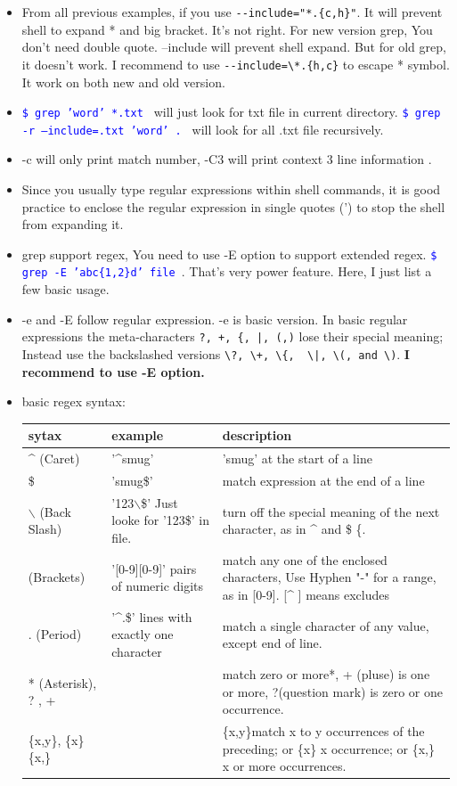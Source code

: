 \documentclass[a4paper,12pt,twoside]{book}
\newcommand{\linuxcommand}[1]{\texttt{\textcolor{blue}{\$ #1 \Pisymbol{psy}{191}}}}
\begin{document}
\begin{itemize}
		\item From all previous examples, if you use \verb!--include="*.{c,h}"!. It will prevent shell to expand * and big bracket. It's not right. For new version grep, You don't need double quote. --include will prevent shell expand. But for old grep, it doesn't work. I recommend to use \verb!--include=\*.{h,c}! to escape * symbol. It work on both new and old version.  

		\item \linuxcommand{grep 'word' *.txt} will just look for txt file in current directory. \linuxcommand{grep -r --include=\*.txt 'word' .} will look for all .txt file recursively.  

		\item -c will only print  match number, -C3 will print context 3 line information .  

		\item Since you usually type regular expressions within shell commands, it is good practice to enclose the regular expression in single quotes (') to stop the shell from expanding it. 

		\item grep support regex, You need to use -E option to support extended regex. \linuxcommand{grep -E 'abc\{1,2\}d' file}.  That's very power feature. Here, I just list a few basic usage. 

		\item -e and -E follow regular expression. -e is basic version. In basic regular expressions the meta-characters \verb=?, +, {, |, (,)= lose their special meaning; Instead use the backslashed versions \verb=\?, \+, \{,  \|, \(, and \)=. \textbf{I recommend to use -E option.}

		\item basic regex syntax:

 \begin{tabular}{p{}|p{}|p{}}
\hline 
sytax 	& example & 	description \\

\hline 
\^{} (Caret)	& '\^{}smug'  & 	'smug' at the start of a line \\
\hline 
\$ &  'smug\$' & 	match expression at the end of a line\\
\hline 
$\backslash$ (Back Slash)&   '123$\backslash$\$'  Just looke for '123\$' in file. &	turn off the special meaning of the next character, as in \^{} and \$ \{.   \\
\hline 
[ ] (Brackets)	&'[0-9][0-9]' pairs of numeric digits &	match any one of the enclosed characters,  Use Hyphen "-" for a range, as in [0-9].  [\^{} ] means excludes\\
\hline 
. (Period) & '\^{}.\$' lines with exactly one character  &	match a single character of any value, except end of line. \\
\hline 
* (Asterisk), ? , + &  &	match zero or more*,  + (pluse) is one or more,   ?(question mark) is zero or one occurrence.   \\
\hline 
\{x,y\}, 	\{x\}	\{x,\} & &	\{x,y\}match x to y occurrences of the preceding;  or \{x\} x occurrence; or  \{x,\} x or more occurrences. \\


\end{tabular}
\end{itemize}
\end{document}
